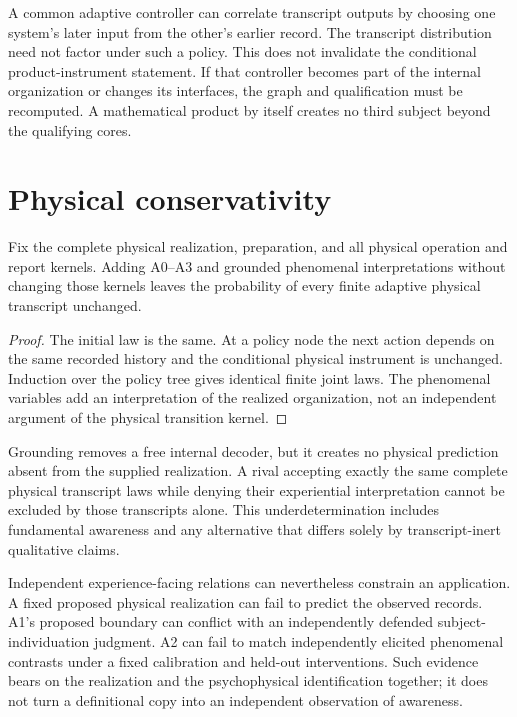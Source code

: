 A common adaptive controller can correlate transcript outputs by choosing one system's later input from the other's earlier record. The transcript distribution need not factor under such a policy. This does not invalidate the conditional product-instrument statement. If that controller becomes part of the internal organization or changes its interfaces, the graph and qualification must be recomputed. A mathematical product by itself creates no third subject beyond the qualifying cores.

\section{Physical conservativity}\label{section:completion:physical-conservativity}
\begin{theorem}\label{thm:conservative}
Fix the complete physical realization, preparation, and all physical operation and report kernels. Adding A0--A3 and grounded phenomenal interpretations without changing those kernels leaves the probability of every finite adaptive physical transcript unchanged.
\end{theorem}
\begin{proof}
The initial law is the same. At a policy node the next action depends on the same recorded history and the conditional physical instrument is unchanged. Induction over the policy tree gives identical finite joint laws. The phenomenal variables add an interpretation of the realized organization, not an independent argument of the physical transition kernel.
\end{proof}

Grounding removes a free internal decoder, but it creates no physical prediction absent from the supplied realization. A rival accepting exactly the same complete physical transcript laws while denying their experiential interpretation cannot be excluded by those transcripts alone. This underdetermination includes fundamental awareness and any alternative that differs solely by transcript-inert qualitative claims.

Independent experience-facing relations can nevertheless constrain an application. A fixed proposed physical realization can fail to predict the observed records. A1's proposed boundary can conflict with an independently defended subject-individuation judgment. A2 can fail to match independently elicited phenomenal contrasts under a fixed calibration and held-out interventions. Such evidence bears on the realization and the psychophysical identification together; it does not turn a definitional copy into an independent observation of awareness.


